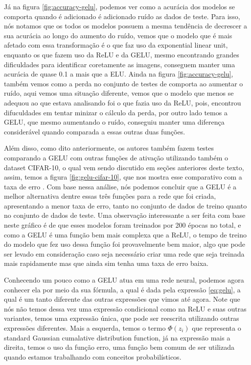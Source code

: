 Já na figura \ref{fig:accuracy-gelu}, podemos ver como a acurácia dos modelos se comporta quando é adicionado é adicionado ruído as dados de teste. Para isso, nós notamos que os todos os modelos possuem a mesma tendência de decrescer a sua acurácia ao longo do aumento do ruído, vemos que o modelo que é mais afetado com essa transformação é o que faz uso da exponential linear unit, enquanto os que fazem uso da ReLU e da GELU, mesmo encontrando grandes dificuldades para identificar coretamente as imagens, conseguem manter uma acurácia de quase 0.1 a mais que a ELU. Ainda na figura \ref{fig:accuracy-gelu}, também vemos como a perda no conjunto de testes de comporta ao aumentar o ruído, aqui vemos uma situação diferente, vemos que o modelo que menos se adequou ao que estava analisando foi o que fazia uso da ReLU, pois, encontrou difuculdades em tentar minizar o cálculo da perda, por outro lado temos a GELU, que mesmo aumentando o ruído, conseguiu manter uma diferença considerável quando comparada a essas outras duas funções.

Além disso, como dito anteriormente, os autores também fazem testes comparando a GELU com outras funções de ativação utilizando também o dataset CIFAR-10, o qual vem sendo discutido em seções anteriores deste texto, assim, temos a figura \ref{fig:gelu-cifar-10}, que nos mostra esse comparativo com a taxa de erro \parencite{GELUArticle}. Com base nessa análise, nós podemos concluir que a GELU é a melhor alternativa dentre essas três funções para a rede que foi criada, apresentando a menor taxa de erro, tanto no conjunto de dados de treino quanto no conjunto de dados de teste. Uma observação interessante a ser feita com base neste gráfico é de que esses modelos foram treinados por 200 épocas no total, e como a GELU é uma função bem mais complexa que a ReLU, o tempo de treino do modelo que fez uso dessa função foi provavelmente bem maior, algo que pode ser levado em consideração caso seja necessário criar uma rede que seja treinada mais rapidamente mas que ainda sim tenha uma taxa de erro baixa.

Conhecendo um pouco como a GELU atua em uma rede neural, podemos agora conhecer ela por meio da sua fórmula, a qual é dada pela expressão \ref{eq:gelu}, a qual é um tanto diferente das outras expressões que vimos até agora. Note que nós não temos dessa vez uma expressão condicional como na ReLU e suas outras variantes, temos uma expressão única, que pode ser reescrita utilizando outras expressões diferentes. Mais a esquerda, temos o termo $\Phi(z_i)$ que representa o standard Gaussian cumalative distribution function, já na expressão mais a direita, temos o uso da função erro, uma função bem comum de ser utilizada quando estamos trabalhando com conceitos probabilísticos.

